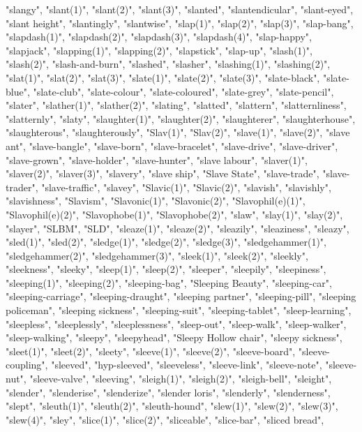 "slangy",
"slant(1)",
"slant(2)",
"slant(3)",
"slanted",
"slantendicular",
"slant-eyed",
"slant height",
"slantingly",
"slantwise",
"slap(1)",
"slap(2)",
"slap(3)",
"slap-bang",
"slapdash(1)",
"slapdash(2)",
"slapdash(3)",
"slapdash(4)",
"slap-happy",
"slapjack",
"slapping(1)",
"slapping(2)",
"slapstick",
"slap-up",
"slash(1)",
"slash(2)",
"slash-and-burn",
"slashed",
"slasher",
"slashing(1)",
"slashing(2)",
"slat(1)",
"slat(2)",
"slat(3)",
"slate(1)",
"slate(2)",
"slate(3)",
"slate-black",
"slate-blue",
"slate-club",
"slate-colour",
"slate-coloured",
"slate-grey",
"slate-pencil",
"slater",
"slather(1)",
"slather(2)",
"slating",
"slatted",
"slattern",
"slatternliness",
"slatternly",
"slaty",
"slaughter(1)",
"slaughter(2)",
"slaughterer",
"slaughterhouse",
"slaughterous",
"slaughterously",
"Slav(1)",
"Slav(2)",
"slave(1)",
"slave(2)",
"slave ant",
"slave-bangle",
"slave-born",
"slave-bracelet",
"slave-drive",
"slave-driver",
"slave-grown",
"slave-holder",
"slave-hunter",
"slave labour",
"slaver(1)",
"slaver(2)",
"slaver(3)",
"slavery",
"slave ship",
"Slave State",
"slave-trade",
"slave-trader",
"slave-traffic",
"slavey",
"Slavic(1)",
"Slavic(2)",
"slavish",
"slavishly",
"slavishness",
"Slavism",
"Slavonic(1)",
"Slavonic(2)",
"Slavophil(e)(1)",
"Slavophil(e)(2)",
"Slavophobe(1)",
"Slavophobe(2)",
"slaw",
"slay(1)",
"slay(2)",
"slayer",
"SLBM",
"SLD",
"sleaze(1)",
"sleaze(2)",
"sleazily",
"sleaziness",
"sleazy",
"sled(1)",
"sled(2)",
"sledge(1)",
"sledge(2)",
"sledge(3)",
"sledgehammer(1)",
"sledgehammer(2)",
"sledgehammer(3)",
"sleek(1)",
"sleek(2)",
"sleekly",
"sleekness",
"sleeky",
"sleep(1)",
"sleep(2)",
"sleeper",
"sleepily",
"sleepiness",
"sleeping(1)",
"sleeping(2)",
"sleeping-bag",
"Sleeping Beauty",
"sleeping-car",
"sleeping-carriage",
"sleeping-draught",
"sleeping partner",
"sleeping-pill",
"sleeping policeman",
"sleeping sickness",
"sleeping-suit",
"sleeping-tablet",
"sleep-learning",
"sleepless",
"sleeplessly",
"sleeplessness",
"sleep-out",
"sleep-walk",
"sleep-walker",
"sleep-walking",
"sleepy",
"sleepyhead",
"Sleepy Hollow chair",
"sleepy sickness",
"sleet(1)",
"sleet(2)",
"sleety",
"sleeve(1)",
"sleeve(2)",
"sleeve-board",
"sleeve-coupling",
"sleeved",
"hyp-sleeved",
"sleeveless",
"sleeve-link",
"sleeve-note",
"sleeve-nut",
"sleeve-valve",
"sleeving",
"sleigh(1)",
"sleigh(2)",
"sleigh-bell",
"sleight",
"slender",
"slenderise",
"slenderize",
"slender loris",
"slenderly",
"slenderness",
"slept",
"sleuth(1)",
"sleuth(2)",
"sleuth-hound",
"slew(1)",
"slew(2)",
"slew(3)",
"slew(4)",
"sley",
"slice(1)",
"slice(2)",
"sliceable",
"slice-bar",
"sliced bread",
